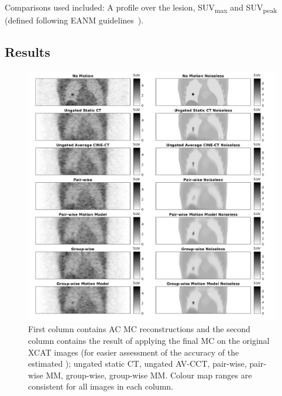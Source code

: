                 Comparisons used included: A profile over the lesion, \gls{SUV}\textsubscript{max} and \gls{SUV}\textsubscript{peak} (defined following \gls{EANM} guidelines~\parencite{Boellaard2015FDG2.0}).
        
        \subsection{Results} \label{sec:comparison_of_motion_correction_methods_incorporating_motion_modelling_for_pet/ct_using_a_single_breath_hold_attenuation_map_results}
            \begin{figure}
                \centering
                
                \includegraphics[width=1.0\linewidth]{figures/motion_correction_1_results_3_visual_analysis.png}
                
                \captionsetup{singlelinecheck=false, justification=centering}
                \caption{First column contains \gls{AC} \gls{MC} reconstructions and the second column contains the result of applying the final  \gls{MC} on the original XCAT images (for easier assessment of the accuracy of the estimated ); ungated static \gls{CT}, ungated \gls{AV-CCT}, pair-wise, pair-wise \gls{MM}, group-wise, group-wise \gls{MM}. Colour map ranges are consistent for all images in each column.}
                \label{fig:comparison_of_motion_correction_methods_incorporating_motion_modelling_for_pet/ct_using_a_single_breath_hold_attenuation_map_visual_analysis}
            \end{figure}
            
